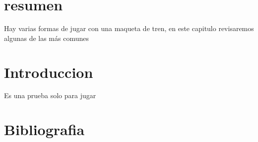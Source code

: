 
\section{resumen}
Hay varias formas de jugar con una maqueta de tren, en este capitulo revisaremos algunas de las más comunes
\section{Introduccion}
\cite{ackerberg2006} Es una prueba solo para jugar
\section{Bibliografia}
\printbibliography[heading=subbibliography]